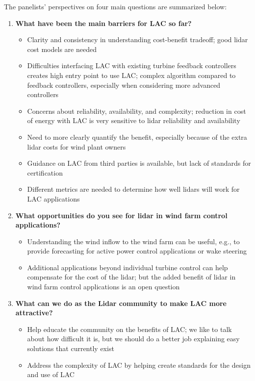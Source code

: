 The panelists' perspectives on four main questions are summarized below:
\begin{enumerate}
    \item \textbf{What have been the main barriers for LAC so far?} 
    \begin{itemize}
        \item Clarity and consistency in understanding cost-benefit tradeoff; good lidar cost models are needed
        \item Difficulties interfacing LAC with existing turbine feedback controllers creates high entry point to use LAC; complex algorithm compared to feedback controllers, especially when considering more advanced controllers
        \item Concerns about reliability, availability, and complexity; reduction in cost of energy with LAC is very sensitive to lidar reliability and availability
        \item Need to more clearly quantify the benefit, especially because of the extra lidar costs for wind plant owners
        \item Guidance on LAC from third parties is available, but lack of standards for certification
        \item Different metrics are needed to determine how well lidars will work for LAC applications
    \end{itemize} 
    \item \textbf{What opportunities do you see for lidar in wind farm control applications?}
    \begin{itemize}
        \item Understanding the wind inflow to the wind farm can be useful, e.g., to provide forecasting for active power control applications or wake steering
        \item Additional applications beyond individual turbine control can help compensate for the cost of the lidar; but the added benefit of lidar in wind farm control applications is an open question
    \end{itemize} 
    \item \textbf{What can we do as the Lidar community to make LAC more attractive?}
    \begin{itemize}
        \item Help educate the community on the benefits of LAC; we like to talk about how difficult it is, but we should do a better job explaining easy solutions that currently exist
        \item Address the complexity of LAC by helping create standards for the design and use of LAC

\end{itemize}
\end{enumerate}
